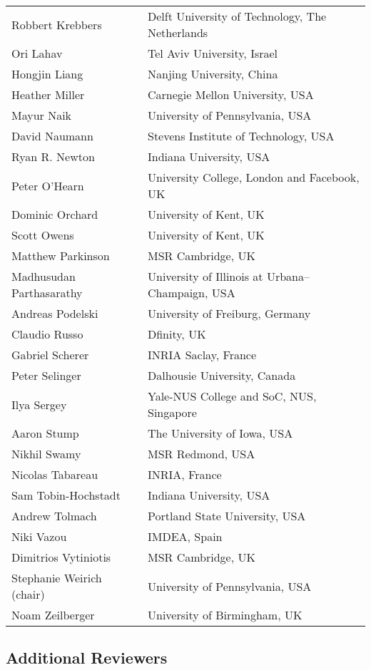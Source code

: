 \begin{tabular}{@{}p{\namewidth}l@{}}
Robbert Krebbers & Delft University of Technology, The Netherlands \\
Ori Lahav & Tel Aviv University, Israel \\
Hongjin Liang & Nanjing University, China \\
Heather Miller & Carnegie Mellon University, USA \\
Mayur Naik & University of Pennsylvania, USA \\
David Naumann & Stevens Institute of Technology, USA \\
Ryan R. Newton & Indiana University, USA \\
Peter O'Hearn & University College,  London and Facebook, UK \\
Dominic Orchard & University of Kent, UK \\
Scott Owens & University of Kent, UK \\
Matthew Parkinson & MSR Cambridge, UK \\
Madhusudan Parthasarathy & University of Illinois at Urbana--Champaign, USA \\
Andreas Podelski & University of Freiburg, Germany \\
Claudio Russo & Dfinity, UK \\
Gabriel Scherer & INRIA Saclay, France \\
Peter Selinger & Dalhousie University, Canada \\
Ilya Sergey & Yale-NUS College and SoC,  NUS, Singapore \\
Aaron Stump & The University of Iowa, USA \\
Nikhil Swamy & MSR Redmond, USA \\
Nicolas Tabareau & INRIA, France \\
Sam Tobin-Hochstadt & Indiana University, USA \\
Andrew Tolmach & Portland State University, USA \\
Niki Vazou & IMDEA, Spain \\
Dimitrios Vytiniotis & MSR Cambridge, UK \\
Stephanie Weirich (chair) & University of Pennsylvania, USA \\
Noam Zeilberger & University of Birmingham, UK \\
\end{tabular}

\subsection*{\sffamily Additional Reviewers}

